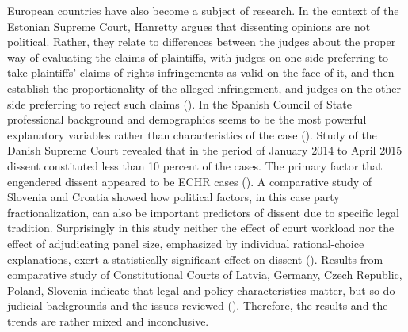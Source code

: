 \documentclass[
  11pt,
]{article}
\begin{document}
European countries have also become a subject of research. In the context of the Estonian Supreme Court, Hanretty argues that dissenting opinions are not political. Rather, they relate to differences between the judges about the proper way of evaluating the claims of plaintiffs, with judges on one side preferring to take plaintiffs' claims of rights infringements as valid on the face of it, and then establish the proportionality of the alleged infringement, and judges on the other side preferring to reject such claims (). In the Spanish Council of State professional background and demographics seems to be the most powerful explanatory variables rather than characteristics of the case (). Study of the Danish Supreme Court revealed that in the period of January 2014 to April 2015 dissent constituted less than 10 percent of the cases. The primary factor that engendered dissent appeared to be ECHR cases (). A comparative study of Slovenia and Croatia showed how political factors, in this case party fractionalization, can also be important predictors of dissent due to specific legal tradition. Surprisingly in this study neither the effect of court workload nor the effect of adjudicating panel size, emphasized by individual rational-choice explanations, exert a statistically significant effect on dissent (). Results from comparative study of Constitutional Courts of Latvia, Germany, Czech Republic, Poland, Slovenia indicate that legal and policy characteristics matter, but so do judicial backgrounds and the issues reviewed (). Therefore, the results and the trends are rather mixed and inconclusive.
\end{document}
